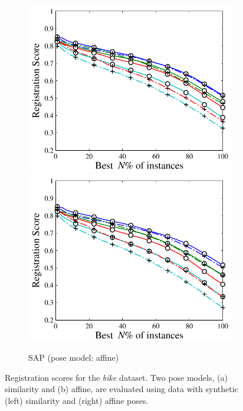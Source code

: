 \begin{figure}[ht]
	\begin{subfigure}[b]{0.48\linewidth}
		\includegraphics[width=\linewidth]{fig/reg/reg2d_affsim.pdf}
		\includegraphics[width=\linewidth]{fig/reg/reg2d_affaff.pdf}
		\caption{SAP (pose model: affine)}
	\end{subfigure}
	\caption{Registration scores for the \emph{bike} dataset. Two pose models, (a) similarity and (b) affine, are evaluated using data with synthetic (left) similarity and (right) affine poses.}
	\label{fig/reg/regresult2d}
\end{figure}

